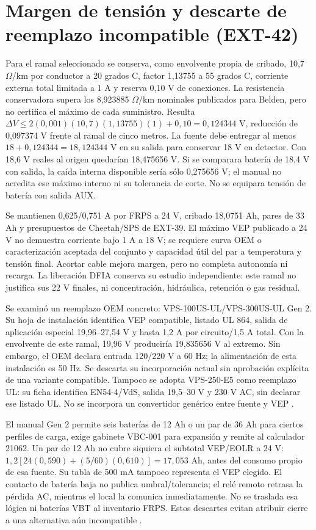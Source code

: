 \section{Margen de tensión y descarte de reemplazo incompatible (EXT-42)}
\label{sec:sd4-ext42}
Para el ramal seleccionado se conserva, como envolvente propia de cribado, 10,7 $\Omega$/km por conductor a 20 grados C, factor 1,13755 a 55 grados C, corriente externa total limitada a 1 A y reserva 0,10 V de conexiones. La resistencia conservadora supera los 8,923885 $\Omega$/km nominales publicados para Belden, pero no certifica el máximo de cada suministro. Resulta $\Delta V\leq2(0,001)(10,7)(1,13755)(1)+0,10=0,124344$ V, reducción de 0,097374 V frente al ramal de cinco metros. La fuente debe entregar al menos $18+0,124344=18,124344$ V en su salida para conservar 18 V en detector. Con 18,6 V reales al origen quedarían 18,475656 V. Si se comparara batería de 18,4 V con salida, la caída interna disponible sería sólo 0,275656 V; el manual no acredita ese máximo interno ni su tolerancia de corte. No se equipara tensión de batería con salida AUX.

Se mantienen 0,625/0,751 A por FRPS a 24 V, cribado 18,0751 Ah, pares de 33 Ah y presupuestos de Cheetah/SPS de EXT-39. El máximo VEP publicado a 24 V no demuestra corriente bajo 1 A a 18 V; se requiere curva OEM o caracterización aceptada del conjunto y capacidad útil del par a temperatura y tensión final. Acortar cable mejora margen, pero no completa autonomía ni recarga. La liberación DFIA conserva su estudio independiente: este ramal no justifica sus 22 V finales, ni concentración, hidráulica, retención o gas residual.

Se examinó un reemplazo OEM concreto: VPS-100US-UL/VPS-300US-UL Gen 2. Su hoja de instalación identifica VEP compatible, listado UL 864, salida de aplicación especial 19,96--27,54 V y hasta 1,2 A por circuito/1,5 A total. Con la envolvente de este ramal, 19,96 V produciría 19,835656 V al extremo. Sin embargo, el OEM declara entrada 120/220 V a 60 Hz; la alimentación de esta instalación es 50 Hz. Se descarta su incorporación actual sin aprobación explícita de una variante compatible. Tampoco se adopta VPS-250-E5 como reemplazo UL: su ficha identifica EN54-4/VdS, salida 19,5--30 V y 230 V AC, sin declarar ese listado UL. No se incorpora un convertidor genérico entre fuente y VEP \parencite{lote42-vpsinst,lote42-e5}.

El manual Gen 2 permite seis baterías de 12 Ah o un par de 36 Ah para ciertos perfiles de carga, exige gabinete VBC-001 para expansión y remite al calculador 21062. Un par de 12 Ah no cubre siquiera el subtotal VEP/EOLR a 24 V: $1,2[24(0,590)+(5/60)(0,610)]=17,053$ Ah, antes del consumo propio de esa fuente. Su tabla de 500 mA tampoco representa el VEP elegido. El contacto de batería baja no publica umbral/tolerancia; el relé remoto retrasa la pérdida AC, mientras el local la comunica inmediatamente. No se traslada esa lógica ni baterías VBT al inventario FRPS. Estos descartes evitan atribuir cierre a una alternativa aún incompatible \parencite{lote42-vpsinst}.

